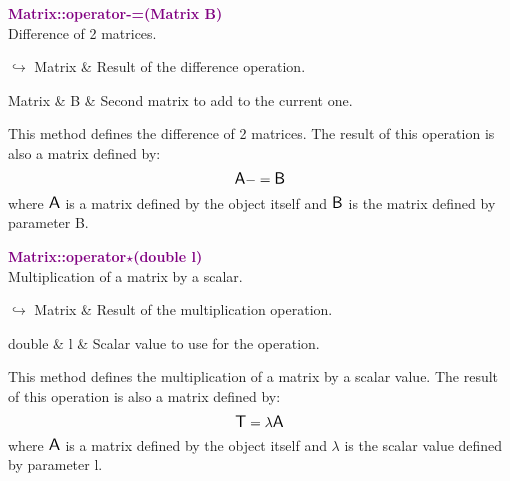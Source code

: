 \textcolor{purple}{\textbf{Matrix::operator-=(Matrix B)}}\label{Matrix::operator-=(Matrix B)}\\
Difference of 2 matrices.\vspace*{-0.5em}
\begin{tcolorbox}[grow to left by=-1cm, width=\textwidth-1cm,myArgs,tabularx={l|R}]
$\hookrightarrow$ Matrix & Result of the difference operation.
\end{tcolorbox}

\begin{tcolorbox}[width=\textwidth,myArgs,tabularx={ll|R}]
Matrix & B & Second matrix to add to the current one.
\end{tcolorbox}

This method defines the difference of 2 matrices.
The result of this operation is also a matrix defined by:
\begin{equation*}
\mbox{\large\ensuremath{\mathsf{A}}} -= \mbox{\large\ensuremath{\mathsf{B}}}
\end{equation*}
where $\mbox{\large\ensuremath{\mathsf{A}}}$ is a matrix defined by the object itself and $\mbox{\large\ensuremath{\mathsf{B}}}$ is the matrix defined by parameter B.

\textcolor{purple}{\textbf{Matrix::operator$\star$(double l)}}\label{Matrix::operator*(double l)}\\
Multiplication of a matrix by a scalar.\vspace*{-0.5em}
\begin{tcolorbox}[grow to left by=-1cm, width=\textwidth-1cm,myArgs,tabularx={l|R}]
$\hookrightarrow$ Matrix & Result of the multiplication operation.
\end{tcolorbox}

\begin{tcolorbox}[width=\textwidth,myArgs,tabularx={ll|R}]
double & l & Scalar value to use for the operation.
\end{tcolorbox}

This method defines the multiplication of a matrix by a scalar value.
The result of this operation is also a matrix defined by:
\begin{equation*}
\mbox{\large\ensuremath{\mathsf{T}}} = \lambda \mbox{\large\ensuremath{\mathsf{A}}}
\end{equation*}
where $\mbox{\large\ensuremath{\mathsf{A}}}$ is a matrix defined by the object itself and $\lambda$ is the scalar value defined by parameter l.

